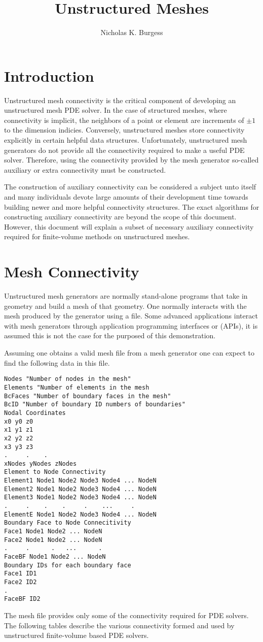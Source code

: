 \documentclass[letterpaper]{article}
\title{Unstructured Meshes}
\author{Nicholas K. Burgess}
\begin{document}
\maketitle
\section{Introduction}
Unstructured mesh connectivity is the critical component of developing an unstructured mesh PDE solver.  In the case of structured meshes, where connectivity is implicit, the neighbors of a point or element are increments of $\pm 1$ to the dimension indicies.  Conversely, unstructured meshes store connectivity explicitly in certain helpful data structures.  Unfortunately, unstructured mesh generators do not provide all the connectivity required to make a useful PDE solver.  Therefore, using the connectivity provided by the mesh generator so-called auxiliary or extra connectivity must be constructed.  

The construction of auxiliary connectivity can be considered a subject unto itself and many individuals devote large amounts of their development time towards building newer and more helpful connectivity structures.  The exact algorithms for constructing auxiliary connectivity are beyond the scope of this document.  However, this document will explain a subset of necessary auxiliary connectivity required for finite-volume methods on unstructured meshes.    

\section{Mesh Connectivity}
Unstructured mesh generators are normally stand-alone programs that take in geometry and build a mesh of that geometry.  One normally interacts with the mesh produced by the generator using a file.  Some advanced applications interact with mesh generators through application programming  interfaces or (APIs), it is assumed this is not the case for the purposed of this demonstration.  

Assuming one obtains a valid mesh file from a mesh generator one can expect to find the following data in this file.  
\begin{lstlisting}[style=Meshfile]
Nodes "Number of nodes in the mesh"
Elements "Number of elements in the mesh
BcFaces "Number of boundary faces in the mesh"
BcID "Number of boundary ID numbers of boundaries"
Nodal Coordinates
x0 y0 z0 
x1 y1 z1 
x2 y2 z2 
x3 y3 z3
.     .    .
xNodes yNodes zNodes
Element to Node Connectivity
Element1 Node1 Node2 Node3 Node4 ... NodeN
Element2 Node1 Node2 Node3 Node4 ... NodeN
Element3 Node1 Node2 Node3 Node4 ... NodeN
.     .    .    .     .    ...     .
ElementE Node1 Node2 Node3 Node4 ... NodeN
Boundary Face to Node Connecitivity
Face1 Node1 Node2 ... NodeN
Face2 Node1 Node2 ... NodeN
.     .      .   ...      .
FaceBF Node1 Node2 ... NodeN
Boundary IDs for each boundary face
Face1 ID1
Face2 ID2
.
FaceBF ID2
\end{lstlisting}
The mesh file provides only some of the connectivity required for PDE solvers.  The following tables describe the various connectivity formed and used by unstructured finite-volume based PDE solvers.  
\end{document}
